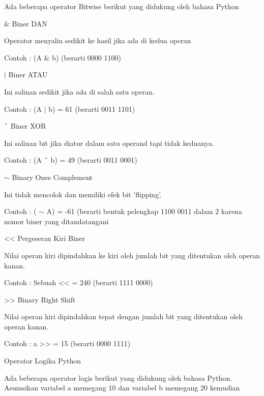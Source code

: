 Ada beberapa operator Bitwise berikut yang didukung oleh bahasa Python \par
\vspace{12pt}
\noindent 
 $  \&  $ Biner DAN \par
\noindent 
Operator menyalin sedikit ke hasil jika ada di kedua operan \par
\noindent 
Contoh : (A  $  \&  $ b) (berarti 0000 1100) \par
\vspace{12pt}
\noindent 
 $  \vert  $ $  $Biner ATAU \par
\noindent 
Ini salinan sedikit jika ada di salah satu operan. \par
\noindent 
Contoh : (A  $  \vert  $ b) = 61 (berarti 0011 1101) \par
\vspace{12pt}
\noindent 
 $  \string^  $ Biner XOR \par
\noindent 
Ini salinan bit jika diatur dalam satu operand tapi tidak keduanya. \par
\noindent 
Contoh : (A  $  \string^  $ b) = 49 (berarti 0011 0001) \par
\vspace{12pt}
\noindent 
 $  \sim  $ Binary Ones Complement \par
\noindent 
Ini tidak mencolok dan memiliki efek bit 'flipping'. \par
\noindent 
Contoh : ( $  \sim  $ A) = -61 (berarti bentuk pelengkap 1100 0011 dalam 2 karena nomor biner yang ditandatangani \par
\vspace{12pt}
\noindent 
<< Pergeseran Kiri Biner \par
\noindent 
Nilai operan kiri dipindahkan ke kiri oleh jumlah bit yang ditentukan oleh operan kanan. \par
\noindent 
Contoh : Sebuah << = 240 (berarti 1111 0000) \par
\vspace{12pt}
\noindent 
>> Binary Right Shift \par
\noindent 
Nilai operan kiri dipindahkan tepat dengan jumlah bit yang ditentukan oleh operan kanan. \par
\noindent 
Contoh : a >> = 15 (berarti 0000 1111) \par
\vspace{12pt}
\noindent 
Operator Logika Python \par
\vspace{12pt}
\noindent 
Ada beberapa operator logis berikut yang didukung oleh bahasa Python. $  $Asumsikan variabel a memegang 10 dan variabel b memegang 20 kemudian \par
